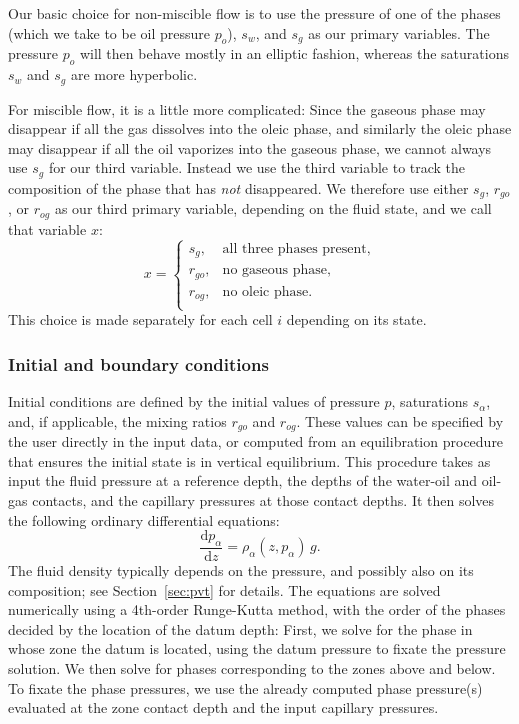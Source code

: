 Our basic choice for non-miscible flow is to use the pressure of one
of the phases (which we take to be oil pressure $p_o$), $s_w$, and
$s_g$ as our primary variables. The pressure $p_o$ will then behave
mostly in an elliptic fashion, whereas the saturations $s_w$ and $s_g$
are more hyperbolic.

For miscible flow, it is a little more complicated: Since the gaseous
phase may disappear if all the gas dissolves into the oleic phase, and
similarly the oleic phase may disappear if all the oil vaporizes into
the gaseous phase, we cannot always use $s_g$ for our third variable.
Instead we use the third variable to track the composition of the phase that
has {\em not} disappeared. We therefore use either $s_g$, $r_{go}$, or
$r_{og}$ as our third primary variable, depending on the fluid state,
and we call that variable $x$:
\begin{equation}
  x = \begin{cases}
    s_g, &  \text{all three phases present}, \\
    r_{go}, &  \text{no gaseous phase}, \\
    r_{og}, &  \text{no oleic phase}. \\
  \end{cases}
  \label{eq:primaryVariableMeaning}
\end{equation}
This choice is made separately for each cell $i$ depending on its
state.

\subsubsection{Initial and boundary conditions}

Initial conditions are defined by the initial values of
pressure $p$, saturations $s_\alpha$, and, if applicable, the mixing
ratios $r_{go}$ and $r_{og}$. These values can be specified by the
user directly in the input data, or computed from an equilibration
procedure that ensures the initial state is in vertical equilibrium.
This procedure takes as input the fluid pressure at a
reference depth, the depths of the water-oil and oil-gas contacts,
and the capillary pressures at those contact depths. It then solves
the following ordinary differential equations:
\begin{equation}
  \frac{\mathrm{d}p_{\alpha}}{\mathrm{d}z} =\rho_{\alpha}(z,p_{\alpha})\, g.
\end{equation}
The fluid density typically depends on the pressure, and possibly
also on its composition; see Section~\ref{sec:pvt} for details. The
equations are solved numerically using a 4th-order Runge-Kutta method, with
the order of the phases decided by the location of the datum depth: First, we
solve for the phase in whose zone the datum is located, using the
datum pressure to fixate the pressure solution. We then solve for phases
corresponding to the zones above and below. To fixate the
phase pressures, we use the already computed phase pressure(s)
evaluated at the zone contact depth and the input capillary pressures.

